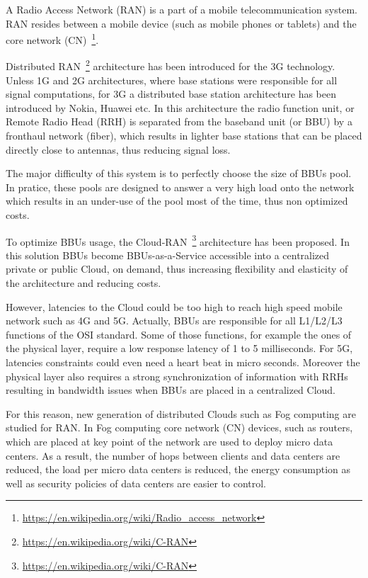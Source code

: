 \documentclass[
    a4paper, 
    12pt, onecolumn,
]{article}
\begin{document}
A Radio Access Network (RAN) is a part of a mobile telecommunication system. RAN resides between a mobile device (such as mobile phones or tablets) and the core network (CN)~\footnote{\url{https://en.wikipedia.org/wiki/Radio_access_network}}.

Distributed RAN~\footnote{\url{https://en.wikipedia.org/wiki/C-RAN}} architecture has been introduced for the 3G technology. Unless 1G and 2G architectures, where base stations were responsible for all signal computations, for 3G a distributed base station architecture has been introduced by Nokia, Huawei etc. In this architecture the radio function unit, or Remote Radio Head (RRH) is separated from the baseband unit (or BBU) by a fronthaul network (fiber), which results in lighter base stations that can be placed directly close to antennas, thus reducing signal loss.

The major difficulty of this system is to perfectly choose the size of BBUs pool. In pratice, these pools are designed to answer a very high load onto the network which results in an under-use of the pool most of the time, thus non optimized costs.

To optimize BBUs usage, the Cloud-RAN~\footnote{\url{https://en.wikipedia.org/wiki/C-RAN}} architecture has been proposed. In this solution BBUs become BBUs-as-a-Service accessible into a centralized private or public Cloud, on demand, thus increasing flexibility and elasticity of the architecture and reducing costs.

However, latencies to the Cloud could be too high to reach high speed mobile network such as 4G and 5G. Actually, BBUs are responsible for all L1/L2/L3 functions of the OSI standard. Some of those functions, for example the ones of the physical layer, require a low response latency of 1 to 5 milliseconds.  For 5G, latencies constraints could even need a heart beat in micro seconds. Moreover the physical layer also requires a strong synchronization of information with RRHs resulting in bandwidth issues when BBUs are placed in a centralized Cloud.

For this reason, new generation of distributed Clouds such as Fog computing are studied for RAN. In Fog computing core network (CN) devices, such as routers, which are placed at key point of the network are used to deploy micro data centers. As a result, the number of hops between clients and data centers are reduced, the load per micro data centers is reduced, the energy consumption as well as security policies of data centers are easier to control.
\end{document}

